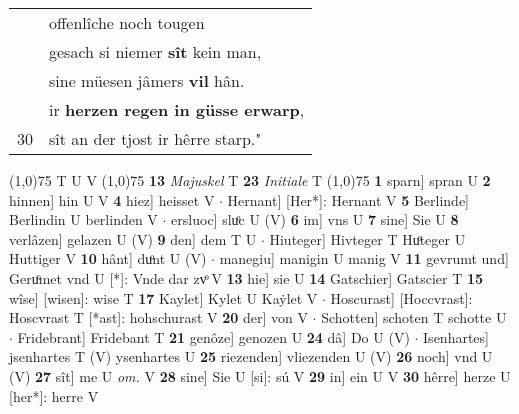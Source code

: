 \documentclass[8pt,a4paper,notitlepage]{article}
\begin{document}
\begin{table}[ht]
\begin{minipage}[t]{0.5\linewidth}
\begin{tabular}{rl}
 & offenlîche noch tougen\\ 
 & gesach si niemer \textbf{sît} kein man,\\ 
 & sine müesen jâmers \textbf{vil} hân.\\ 
 & ir \textbf{herzen regen in güsse erwarp},\\ 
30 & sît an der tjost ir hêrre starp."\\ 
\end{tabular}
\scriptsize
\line(1,0){75} \newline
T U V \newline
\line(1,0){75} \newline
\textbf{13} \textit{Majuskel} T  \textbf{23} \textit{Initiale} T  \newline
\line(1,0){75} \newline
\textbf{1} sparn] spran U \textbf{2} hinnen] hin U V \textbf{4} hiez] heisset V  $\cdot$ Hernant] [Her*]: Hernant V \textbf{5} Berlinde] Berlindin U berlinden V  $\cdot$ ersluoc] sluͦc U (V) \textbf{6} im] vns U \textbf{7} sine] Sie U \textbf{8} verlâzen] gelazen U (V) \textbf{9} den] dem T U  $\cdot$ Hiuteger] Hivteger T Huͦteger U Huttiger V \textbf{10} hânt] duͦnt U (V)  $\cdot$ manegiu] manigin U manig V \textbf{11} gevrumt und] Geruͦmet vnd U [*]: Vnde dar zvͦ V \textbf{13} hie] sie U \textbf{14} Gatschier] Gatscier T \textbf{15} wîse] [wisen]: wise T \textbf{17} Kaylet] Kylet U Kaẏlet V  $\cdot$ Hoscurast] [Hoccvrast]: Hoscvrast T [*ast]: hohschurast V \textbf{20} der] von V  $\cdot$ Schotten] schoten T schotte U  $\cdot$ Fridebrant] Fridebant T \textbf{21} genôze] genozen U \textbf{24} dâ] Do U (V)  $\cdot$ Isenhartes] jsenhartes T (V) ysenhartes U \textbf{25} riezenden] vliezenden U (V) \textbf{26} noch] vnd U (V) \textbf{27} sît] me U \textit{om.} V \textbf{28} sine] Sie U [si]: sú V \textbf{29} in] ein U V \textbf{30} hêrre] herze U [her*]: herre V \newline
\end{minipage}
\end{table}
\end{document}
